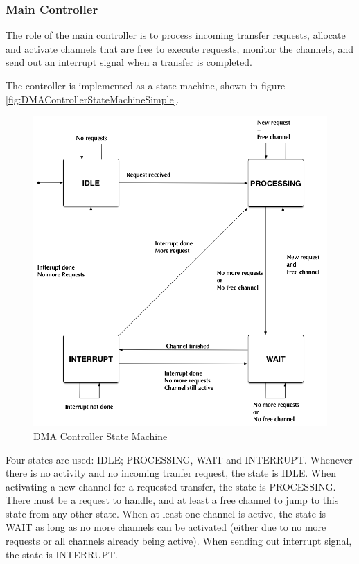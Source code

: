 \subsubsection{Main Controller}
The role of the main controller is to process incoming transfer requests, allocate and activate
channels that are free to execute requests, monitor the channels, and send out an interrupt signal
when a transfer is completed.

The controller is implemented as a state machine, shown in figure \ref{fig:DMAControllerStateMachineSimple}.

\begin{figure}[htb]
    \centering
    \includegraphics[width=1\textwidth]{Figures/DMA/StateMachineFinalSimple}
    \caption{DMA Controller State Machine}
    \label{fig:DMAControllerStateMachineSimple2}
\end{figure}

Four states are used: IDLE; PROCESSING, WAIT and INTERRUPT.
Whenever there is no activity and no incoming tranfer request, the state is IDLE.
When activating a new channel for a requested transfer, the state is PROCESSING. There must be a request to handle, and at least a free channel to jump to this state from any other state.
When at least one channel is active, the state is WAIT as long as no more channels can be activated (either due to no more requests or all channels already being active).
When sending out interrupt signal, the state is INTERRUPT.

